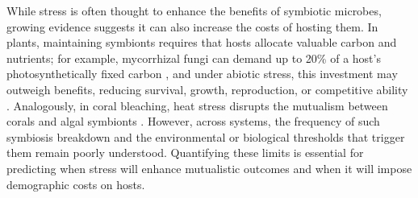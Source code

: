\documentclass[12pt]{article}\usepackage[]{graphicx}\usepackage[dvipsnames]{xcolor}
\newcommand{\tom}[2]{{\color{red}{#1}}\footnote{\textit{\color{red}{#2}}}}
\begin{document}
While stress is often thought to enhance the benefits of symbiotic microbes, growing evidence suggests it can also increase the costs of hosting them. 
In plants, maintaining symbionts requires that hosts allocate valuable carbon and nutrients; for example, mycorrhizal fungi can demand up to 20\% of a host’s photosynthetically fixed carbon \citep{thirkell2020carbon,soudzilovskaia2015quantitative}, and under abiotic stress, this investment may outweigh benefits, reducing survival, growth, reproduction, or competitive ability \citep{johnson1997functioning, bronstein2001exploitation, klironomos2003variation}. 
Analogously, in coral bleaching, heat stress disrupts the mutualism between corals and algal symbionts \citep{vidal2009coral, marangon2025destabilization}.
However, across systems, the frequency of such symbiosis breakdown and the environmental or biological thresholds that trigger them remain poorly understood. 
Quantifying these limits is essential for predicting when stress will enhance mutualistic outcomes and when it will impose demographic costs on hosts.


\end{document}
